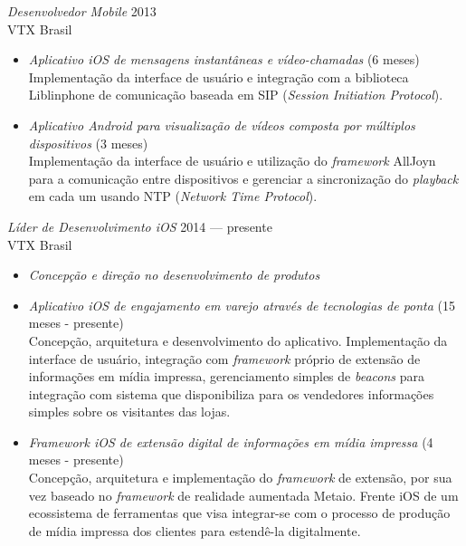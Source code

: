 \documentclass[]{res} %
\newcommand{\sbt}{\,\begin{picture}(-1,1)(-2,-3)\circle*{2}\end{picture}\ }
\def \myitemback{0.55cm}
\def \myitemsep{0pt}
\def \mypositionface{\sl}
\def \myorgface{\sc}
\begin{document}
\begin{resume}
    {\mypositionface Desenvolvedor Mobile} \hfill 2013 \\
    {\myorgface VTX Brasil}

    \begin{itemize}[itemsep=\myitemsep,leftmargin=\myitemback]
    \item[\sbt] {\it Aplicativo iOS de mensagens instantâneas e vídeo-chamadas} \hfill (6 meses)\\
    Implementação da interface de usuário e integração com a biblioteca Liblinphone de comunicação baseada em SIP ({\it Session Initiation Protocol}).
    \item[\sbt] {\it Aplicativo Android para visualização de vídeos composta por múltiplos dispositivos} \hfill (3 meses)\\
    Implementação da interface de usuário e utilização do {\it framework} AllJoyn para a comunicação entre dispositivos e gerenciar a sincronização do {\it playback} em cada um usando NTP ({\it Network Time Protocol}).
    \end{itemize}

    {\mypositionface Líder de Desenvolvimento iOS} \hfill 2014 — presente\\
    {\myorgface VTX Brasil}

    \begin{itemize}[itemsep=\myitemsep,leftmargin=\myitemback]
    \item[\sbt] {\it Concepção e direção no desenvolvimento de produtos}
    \item[\sbt] {\it Aplicativo iOS de engajamento em varejo através de tecnologias de ponta} \hfill (15 meses - presente)\\
    Concepção, arquitetura e desenvolvimento do aplicativo. Implementação da interface de usuário, integração com {\it framework} próprio de extensão de informações em mídia impressa, gerenciamento simples de {\it beacons} para integração com sistema que disponibiliza para os vendedores informações simples sobre os visitantes das lojas.
    \item[\sbt] {\it Framework iOS de extensão digital de informações em mídia impressa} \hfill (4 meses - presente)\\
    Concepção, arquitetura e implementação do {\it framework} de extensão, por sua vez baseado no {\it framework} de realidade aumentada Metaio. Frente iOS de um ecossistema de ferramentas que visa integrar-se com o processo de produção de mídia impressa dos clientes para estendê-la digitalmente.
\end{itemize}
\else

\end{resume}
\end{document}
